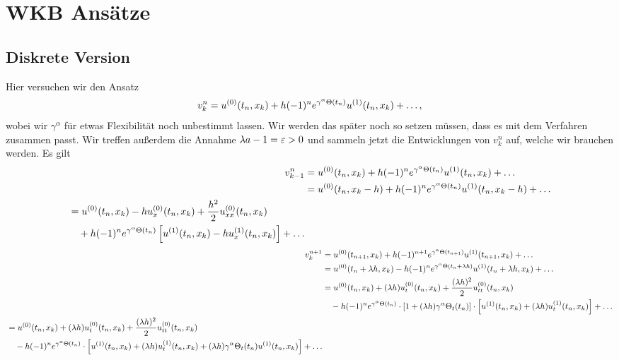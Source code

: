 \section {WKB Ansätze}

\subsection {Diskrete Version}

Hier versuchen wir den Ansatz
\begin{align} \label{eq:wkb:ansatz1}
v^n_k = u^{(0)}(t_n, x_k) + h (-1)^n e^{\gamma^\alpha \Theta(t_n)} u^{(1)}(t_n, x_k) + \ldots,
\end{align}
wobei wir $\gamma^\alpha$ für etwas Flexibilität noch unbestimmt lassen. 
Wir werden das später noch so setzen müssen, dass es mit dem Verfahren zusammen passt.
Wir treffen außerdem die Annahme $\lambda a - 1 = \varepsilon > 0$ und sammeln jetzt die Entwicklungen von $v^n_k$ auf, welche wir brauchen werden.
Es gilt
\begin{align}\nonumber
v^n_{k-1} &= u^{(0)}(t_n, x_k) + h (-1)^n e^{\gamma^\alpha \Theta(t_n)} u^{(1)}(t_n, x_k) + \ldots\\ \nonumber
&= u^{(0)}(t_n, x_k-h) + h (-1)^n e^{\gamma^\alpha \Theta(t_n)} u^{(1)}(t_n, x_k-h) + \ldots\\
\begin{split}
&= u^{(0)}(t_n, x_k) - h u^{(0)}_x(t_n, x_k) + \frac {h^2}2 u^{(0)}_{xx}(t_n, x_k)\\
&\quad + h (-1)^n e^{\gamma^\alpha \Theta(t_n)} \left[ u^{(1)}(t_n, x_k) - h u^{(1)}_x(t_n, x_k) \right] + \ldots
\end{split}
\end{align}
{\small
\begin{align}\nonumber
v^{n+1}_k &= u^{(0)}(t_{n+1}, x_k) + h (-1)^{n+1} e^{\gamma^\alpha \Theta(t_{n+1})} u^{(1)}(t_{n+1}, x_k) + \ldots\\ \nonumber
          &= u^{(0)}(t_n + \lambda h, x_k) - h (-1)^n e^{\gamma^\alpha \Theta(t_n + \lambda h)} u^{(1)}(t_n + \lambda h, x_k) + \ldots\\ \nonumber
          &= u^{(0)}(t_n, x_k) + (\lambda h) u^{(0)}_t(t_n, x_k) + \frac {(\lambda h)^2}2 u^{(0)}_{tt}(t_n, x_k)\\\nonumber
          &\quad - h (-1)^n e^{\gamma^\alpha \Theta(t_n)} \cdot \left[ 1 + (\lambda h) \gamma^\alpha \Theta_t(t_n) \right] \cdot \left[ u^{(1)}(t_n, x_k) + (\lambda h) u^{(1)}_t(t_n, x_k) \right] + \ldots\\
\begin{split}
          &= u^{(0)}(t_n, x_k) + (\lambda h) u^{(0)}_t(t_n, x_k) + \frac {(\lambda h)^2}2 u^{(0)}_{tt}(t_n, x_k)\\
          &\quad - h (-1)^n e^{\gamma^\alpha \Theta(t_n)} \cdot \left[ u^{(1)}(t_n, x_k) + (\lambda h) u^{(1)}_t(t_n, x_k) + (\lambda h) \gamma^\alpha \Theta_t(t_n) u^{(1)}(t_n, x_k) \right] + \ldots
\end{split}
\end{align}
}
